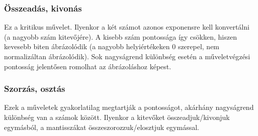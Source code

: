 \documentclass[12pt]{article}
\theoremstyle{plain}
\begin{document}
\subsubsection{Összeadás, kivonás}

Ez a kritikus művelet. Ilyenkor a két számot azonos exponensre kell konvertálni (a nagyobb szám kitevőjére). A kisebb szám pontossága így csökken, hiszen kevesebb biten ábrázolódik (a nagyobb helyiértékeken 0 szerepel, nem normalizáltan ábrázolódik). Sok nagyságrend különbség esetén a műveletvégzési pontosság jelentősen romolhat az ábrázoláshoz képest.


\subsubsection{Szorzás, osztás}

Ezek a műveletek gyakorlatilag megtartják a pontosságot, akárhány nagyságrend különbség van a számok között. Ilyenkor a kitevőket összeadjuk/kivonjuk egymásból, a mantisszákat összeszorozzuk/elosztjuk egymással.





\end{document}
